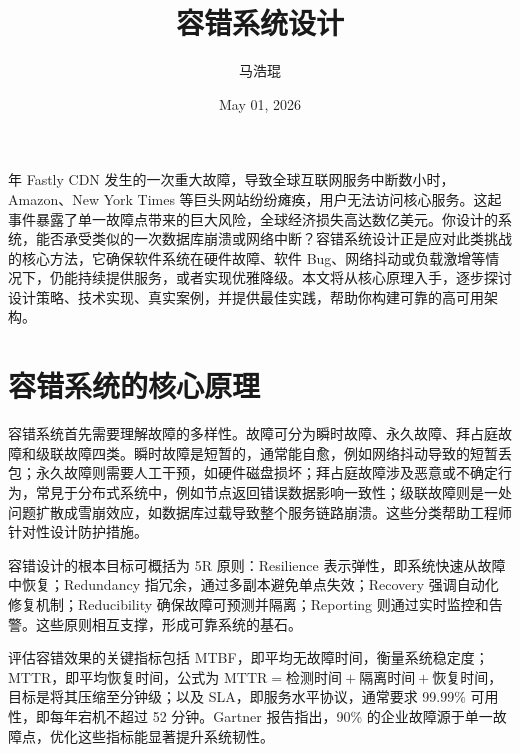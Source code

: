 \title{容错系统设计}
\author{马浩琨}
\date{May 01, 2026}
 年 Fastly CDN 发生的一次重大故障，导致全球互联网服务中断数小时，Amazon、New York Times 等巨头网站纷纷瘫痪，用户无法访问核心服务。这起事件暴露了单一故障点带来的巨大风险，全球经济损失高达数亿美元。你设计的系统，能否承受类似的一次数据库崩溃或网络中断？容错系统设计正是应对此类挑战的核心方法，它确保软件系统在硬件故障、软件 Bug、网络抖动或负载激增等情况下，仍能持续提供服务，或者实现优雅降级。本文将从核心原理入手，逐步探讨设计策略、技术实现、真实案例，并提供最佳实践，帮助你构建可靠的高可用架构。\par
\chapter{容错系统的核心原理}
容错系统首先需要理解故障的多样性。故障可分为瞬时故障、永久故障、拜占庭故障和级联故障四类。瞬时故障是短暂的，通常能自愈，例如网络抖动导致的短暂丢包；永久故障则需要人工干预，如硬件磁盘损坏；拜占庭故障涉及恶意或不确定行为，常見于分布式系统中，例如节点返回错误数据影响一致性；级联故障则是一处问题扩散成雪崩效应，如数据库过载导致整个服务链路崩溃。这些分类帮助工程师针对性设计防护措施。\par
容错设计的根本目标可概括为 5R 原则：Resilience 表示弹性，即系统快速从故障中恢复；Redundancy 指冗余，通过多副本避免单点失效；Recovery 强调自动化修复机制；Reducibility 确保故障可预测并隔离；Reporting 则通过实时监控和告警。这些原则相互支撑，形成可靠系统的基石。\par
评估容错效果的关键指标包括 MTBF，即平均无故障时间，衡量系统稳定度；MTTR，即平均恢复时间，公式为 $\text{MTTR} = \text{检测时间} + \text{隔离时间} + \text{恢复时间}$，目标是将其压缩至分钟级；以及 SLA，即服务水平协议，通常要求 99.99\%{} 可用性，即每年宕机不超过 52 分钟。Gartner 报告指出，90\%{} 的企业故障源于单一故障点，优化这些指标能显著提升系统韧性。\par
